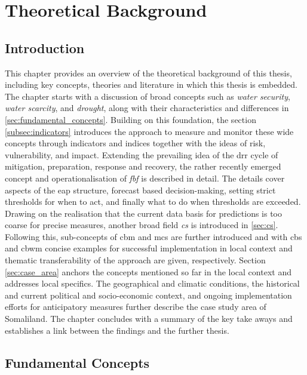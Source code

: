 \chapter{Theoretical Background}

\label{chapter2} 

\section{Introduction}

This chapter provides an overview of the theoretical background of this thesis, including key concepts, theories and literature in which this thesis is embedded. The chapter starts with a discussion of broad concepts such as \textit{water security}, \textit{water scarcity}, and \textit{drought}, along with their characteristics and differences in \autoref{sec:fundamental_concepts}. Building on this foundation, the section \ref{subsec:indicators} introduces the approach to measure and monitor these wide concepts through indicators and indices together with the ideas of risk, vulnerability, and impact. Extending the prevailing idea of the \acrfull{drr} cycle of mitigation, preparation, response and recovery, the rather recently emerged concept and operationalisation of \textit{\acrfull{fbf}} is described in detail. The details cover aspects of the \acrlong{eap} structure, forecast based decision-making, setting strict thresholds for when to act, and finally what to do when thresholds are exceeded.\newline
Drawing on the realisation that the current data basis for predictions is too coarse for precise measures, another broad field \textit{\acrfull{cs}} is introduced in \autoref{sec:cs}. Following this, sub-concepts of \acrfull{cbm} and \acrfull{mcs} are further introduced and with \acrfull{cbs} and \acrfull{cbwm} concise examples for successful implementation in local context and thematic transferability of the approach are given, respectively.\newline
Section \ref{sec:case_area} anchors the concepts mentioned so far in the local context and addresses local specifics. The geographical and climatic conditions, the historical and current political and socio-economic context, and ongoing implementation efforts for anticipatory measures further describe the case study area of Somaliland. The chapter concludes with a summary of the key take aways and establishes a link between the findings and the further thesis.


\section{Fundamental Concepts}\label{sec:fundamental_concepts}

